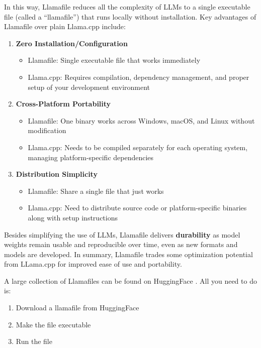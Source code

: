 In this way, Llamafile reduces all the complexity of LLMs to a single executable file (called a ``llamafile'') that runs locally without installation. Key advantages of Llamafile over plain Llama.cpp include:

\begin{enumerate}
\item \textbf{Zero Installation/Configuration}
\begin{itemize}
\item Llamafile: Single executable file that works immediately
\item Llama.cpp: Requires compilation, dependency management, and proper setup of your development environment
\end{itemize}

\item \textbf{Cross-Platform Portability}
\begin{itemize}
\item Llamafile: One binary works across Windows, macOS, and Linux without modification
\item Llama.cpp: Needs to be compiled separately for each operating system, managing platform-specific dependencies
\end{itemize}

\item \textbf{Distribution Simplicity}
\begin{itemize}
\item Llamafile: Share a single file that just works
\item Llama.cpp: Need to distribute source code or platform-specific binaries along with setup instructions
\end{itemize}
\end{enumerate}

Besides simplifying the use of LLMs, Llamafile delivers \textbf{durability} as model weights remain usable and reproducible over time, even as new formats and models are developed. In summary, Llamafile trades some optimization potential from LLama.cpp for improved ease of use and portability.

A large collection of Llamafiles can be found on HuggingFace . All you need to do is:

\begin{enumerate}
\item Download a llamafile from HuggingFace
\item Make the file executable
\item Run the file
\end{enumerate}

